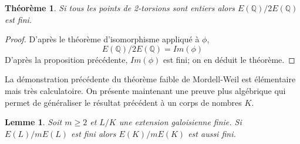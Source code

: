\documentclass{article}
\newtheorem{theoreme}{Théorème}
\newtheorem{lemme}{Lemme}
\begin{document}
\begin{theoreme}
Si tous les points de 2-torsions sont entiers alors $E(\mathbb{Q})/2E(\mathbb{Q})$ est fini.
\end{theoreme}

\begin{proof}
D'après le théorème d'isomorphisme appliqué à $\phi$,
\begin{equation*}
E(\mathbb{Q})/2E(\mathbb{Q}) = Im(\phi)
\end{equation*}
D'après la proposition précédente, $Im(\phi)$ est fini; on en déduit le théorème.
\end{proof}

La démonstration précédente du théorème faible de Mordell-Weil est élémentaire mais très calculatoire.
On présente maintenant une preuve plus algébrique qui permet de généraliser le résultat précédent à un corps de
nombres $K$.

\begin{lemme}
Soit $m\geq 2$ et $L/K$ une extension galoisienne finie. Si $E(L)/mE(L)$ est fini alors
$E(K)/mE(K)$ est aussi fini.
\end{lemme}
\end{document}
